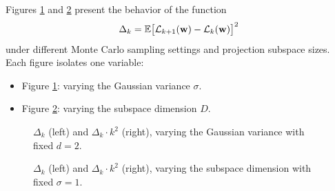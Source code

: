 \documentclass{article}
\begin{document}
Figures \ref{fig:delta_random_sigma} and \ref{fig:delta_random_dim} present the behavior of the function
$$
  \Delta_k =
  \mathbb{E} \bigl[ \mathcal{L}_{k+1}(\mathbf{w}) - \mathcal{L}_k(\mathbf{w}) \bigr]^2
$$
under different Monte Carlo sampling settings and projection subspace sizes. Each figure isolates one variable:

\begin{itemize}
  \item Figure \ref{fig:delta_random_sigma}: varying the Gaussian variance $\sigma$.
  \item Figure \ref{fig:delta_random_dim}: varying the subspace dimension $D$.
\end{itemize}

\begin{figure}[!htbp]
  \hspace*{-2.6cm}
  \caption{$\Delta_k$ (left) and $\Delta_k \cdot k^2$ (right), varying the Gaussian variance with fixed $d = 2$.}
  \label{fig:delta_random_sigma}
\end{figure}

\begin{figure}[!htbp]
  \hspace*{-2.6cm}
  \caption{$\Delta_k$ (left) and $\Delta_k \cdot k^2$ (right), varying the subspace dimension with fixed $\sigma = 1$.}
  \label{fig:delta_random_dim}
\end{figure}
\end{document}
